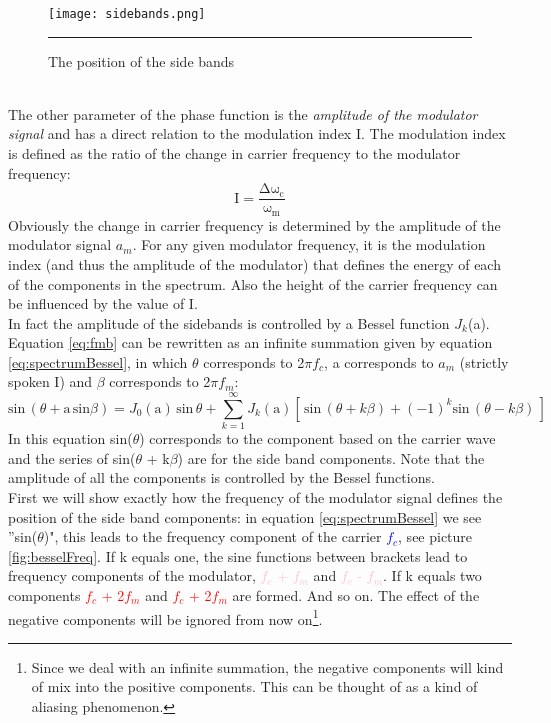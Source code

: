 \begin{figure}[htbp]
\centering
\texttt{[image: sidebands.png]}
\rule{30em}{0.5pt}
\caption{The position of the side bands}
\label{fig:sidebands}
\end{figure}\\
The other parameter of the phase function is the \emph{amplitude of the modulator signal} and has a direct relation to the modulation index I. The modulation index  is defined as the ratio of the change in carrier frequency to the modulator frequency:
\begin{equation}
\mathrm{I = \frac{ \Delta \omega_{c} }{ \omega_{m} }}
\label{eq:I}
\end{equation}
Obviously the change in carrier frequency is determined by the amplitude of the modulator signal $a_{m}$. For any given modulator frequency, it is the modulation index (and thus the amplitude of the modulator) that defines the energy of each of the components in the spectrum. Also the height of the carrier frequency can be influenced by the value of I.\\ In fact the amplitude of the sidebands is controlled by a Bessel function $J_{k}$(a). Equation \ref{eq:fmb} can be rewritten as an infinite summation given by equation \ref{eq:spectrumBessel}, in which $\theta$ corresponds to 2$\pi f_{c}$, a corresponds to $a_{m}$ (strictly spoken I) and $\beta$ corresponds to 2$\pi f_{m}$:
\begin{equation}
\mathrm{sin}\,(\theta + \mathrm{a}\, \mathrm{sin} \beta) = J_{0}(\mathrm{a})\,\mathrm{sin}\,\theta + \sum_{k=1}^{\infty} J_{k}(\mathrm{a}) \left[\,\mathrm{sin}\,(\theta + k\beta) + (-1)^{k}\mathrm{sin}\,(\theta - k\beta)\, \right]
\label{eq:spectrumBessel}
\end{equation}
In this equation sin($\theta$) corresponds to the component based on the carrier wave and the series of sin($\theta$ + k$\beta$) are for the side band components. Note that the amplitude of all the components is controlled by the Bessel functions.\\
First we will show exactly how the frequency of the modulator signal defines the position of the side band components: in equation \ref{eq:spectrumBessel} we see ''sin($\theta$)", this leads to the frequency component of the carrier \textcolor{blue}{$f_{c}$}, see picture \ref{fig:besselFreq}. If k equals one, the sine functions between brackets lead to frequency components of the modulator, \textcolor{pink}{$f_{c}$ + $f_{m}$} and \textcolor{pink}{$f_{c}$ - $f_{m}$}. If k equals two components \textcolor{red}{$f_{c}$ + 2$f_{m}$} and \textcolor{red}{$f_{c}$ + 2$f_{m}$} are formed. And so on. The effect of the negative components will be ignored from now on\footnote[1]{Since we deal with an infinite summation, the negative components will kind of mix into the positive components. This can be thought of as a kind of aliasing phenomenon.}.

